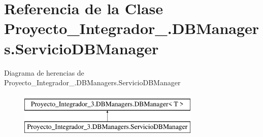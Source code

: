 \hypertarget{class_proyecto___integrador__3_1_1_d_b_managers_1_1_servicio_d_b_manager}{\section{Referencia de la Clase Proyecto\-\_\-\-Integrador\-\_.\-D\-B\-Managers.\-Servicio\-D\-B\-Manager}
\label{class_proyecto___integrador__3_1_1_d_b_managers_1_1_servicio_d_b_manager}
}
Diagrama de herencias de Proyecto\-\_\-\-Integrador\-\_.\-D\-B\-Managers.\-Servicio\-D\-B\-Manager\begin{figure}[H]
\begin{center}
\leavevmode
\includegraphics[height=2.000000cm]{class_proyecto___integrador__3_1_1_d_b_managers_1_1_servicio_d_b_manager}
\end{center}
\end{figure}
